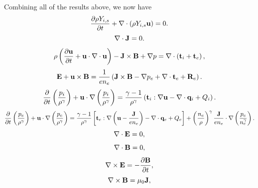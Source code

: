 \documentclass[a4paper,11pt]{report}
\begin{document}
Combining all of the results above, we now have
\begin{equation}
    \label{eq:generalized_MHD_mass}
    \frac{\partial \rho Y_{i,s}}{\partial t} + \nabla \cdot \left( \rho Y_{i,s} \mathbf{u} \right) = 0.
\end{equation}
\begin{equation}
    \label{eq:generalized_MHD_div_current}
    \nabla \cdot \mathbf{J} = 0.
\end{equation}
\begin{equation}
    \label{eq:generalized_MHD_vel}
    \rho \left( \frac{\partial \mathbf{u}}{\partial t} + \mathbf{u} \cdot \nabla \cdot \mathbf{u} \right) - \mathbf{J} \times \mathbf{B} + \nabla p = \nabla \cdot \left(  \mathbf{t}_i + \mathbf{t}_e \right),
\end{equation}
\begin{equation}
    \label{eq:generalized_MHD_ohms}
    \mathbf{E} + \mathbf{u} \times \mathbf{B} = \frac{1}{e n_e} \left( \mathbf{J} \times \mathbf{B} - \nabla p_e + \nabla \cdot \mathbf{t}_e + \mathbf{R}_e \right).
\end{equation}
\begin{equation}
    \label{eq:generalized_MHD_pi}
    \frac{\partial}{\partial t} \left( \frac{p_i}{\rho^\gamma} \right) + \mathbf{u} \cdot \nabla \left(\frac{p_i}{\rho^\gamma} \right) = \frac{\gamma - 1}{\rho^\gamma} \left( \mathbf{t}_i : \nabla \mathbf{u} - \nabla \cdot \mathbf{q}_i + Q_i \right).
\end{equation}
\begin{equation}
    \label{eq:generalized_MHD_pe}
    \frac{\partial}{\partial t} \left( \frac{p_e}{\rho^\gamma} \right) + \mathbf{u} \cdot \nabla \left(\frac{p_e}{\rho^\gamma} \right) = \frac{\gamma - 1}{\rho^\gamma} \left[ \mathbf{t}_e : \nabla \left( \mathbf{u} - \frac{\mathbf{J}}{en_e} \right) - \nabla \cdot \mathbf{q}_e + Q_e \right] + \left( \frac{n_e}{\rho} \right)^\gamma \frac{\mathbf{J}}{e n_e} \cdot \nabla \left( \frac{p_e}{n_e^\gamma} \right).
\end{equation}
\begin{equation}
    \label{eq:generalized_MHD_maxwell1}
    \nabla \cdot \mathbf{E} = 0,
\end{equation}
\begin{equation}
    \label{eq:generalized_MHD_maxwell2}
    \nabla \cdot \mathbf{B} = 0,
\end{equation}
\begin{equation}
    \label{eq:generalized_MHD_maxwell3}
    \nabla \times \mathbf{E} = -\frac{ \partial \mathbf{B}}{\partial t},
\end{equation}
\begin{equation}
    \label{eq:generalized_MHD_maxwell4}
    \nabla \times \mathbf{B} = \mu_0 \mathbf{J},
\end{equation}
\end{document}
